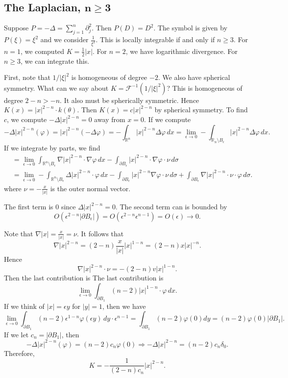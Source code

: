 \documentclass[12pt]{scrartcl}
\newcommand{\R}{\mathbb{R}}
\let \phi \varphi
\begin{document}
\subsection{The Laplacian, $ \mathbf{n \ge 3}$}
Suppose $P = -\Delta = \sum_{j=1}^n \partial_j^2$.  Then $P(D) = D^2$.  The symbol is given by $P(\xi) = \xi^2$ and we consider $\frac{1}{\xi^2}$.  This is locally integrable if and only if $n \ge 3$.  For $n = 1$, we computed $K = \frac{1}{2}|x|$.  For $n = 2$, we have logarithmic divergence.  For $n \ge 3$, we can integrate this.  

First, note that $1/|\xi|^2$ is homogeneous of degree $-2$.  We also have spherical symmetry.  What can we say about $K = \mathcal F^{-1}(1/|\xi|^2)$?  This is homogeneous of degree $2 - n > -n$.  It also must be spherically symmetric.  Hence $K(x) = |x|^{2-n} \cdot k(\theta)$.  Then $K(x) = c|x|^{2-n}$ by spherical symmetry.  To find $c$, we compute $-\Delta |x|^{2-n} = 0$ away from $x = 0$.  If we compute $$-\Delta |x|^{2-n}(\phi) = |x|^{2-n}(-\Delta \phi)= -\int_{\R^n} |x|^{2-n} \Delta \phi\, dx = \lim_{\epsilon \to 0} - \int_{\R_n\setminus B_\epsilon} |x|^{2-n} \Delta \phi \, dx.$$
If we integrate by parts, we find 
\begin{align*}
&= \lim_{\epsilon \to 0} \int_{\R^n \setminus B_\epsilon} \nabla |x|^{2-n} \cdot \nabla \phi\, dx - \int_{\partial B_\epsilon} |x|^{2-n} \cdot \nabla \phi \cdot \nu \, d\sigma\\
&= \lim_{\epsilon \to 0} -\int_{\R^n\setminus B_\epsilon} \Delta |x|^{2-n} \cdot\phi \, dx - \int_{\partial B_\epsilon} |x|^{2-n} \nabla \phi \cdot \nu \, d\sigma  +\int_{\partial B_\epsilon} \nabla |x|^{2-n} \cdot \nu \cdot \phi\,  d\sigma.
\end{align*}
where $\nu = -\frac{x}{|x|}$ is the outer normal vector.

The first term is $0$ since $\Delta |x|^{2-n} = 0$.  The second term can is bounded by 
$$O(\epsilon^{2-n} |\partial B_\epsilon|) = O(\epsilon^{2-n} \epsilon^{n-1}) = O(\epsilon) \to 0.$$


Note that $\nabla |x| = \frac{x}{|x|} = \nu$.  It follows that $$\nabla |x|^{2-n} = (2-n) \frac{x}{|x|} |x|^{1-n} = (2-n) x |x|^{-n}.$$
Hence $$\nabla |x|^{2-n} \cdot \nu = -(2 - n)v|x|^{1-n}.$$
Then the last contribution is 
The last contribution is 
$$\lim_{\epsilon \to 0} \int_{\partial B_1} (n-2)|x|^{1-n} \cdot \phi \,dx.$$
If we think of $|x| = \epsilon y$ for $|y| = 1$, then we have 
$$\lim_{\epsilon \to 0} \int_{\partial B_1} (n-2) \epsilon^{1-n} \phi(\epsilon y)\, dy \cdot \epsilon^{n-1}=  \int_{\partial B_1} (n-2) \phi(0) dy = (n-2) \phi(0)|\partial B_1|.$$
If we let $c_n = |\partial B_1|$, then
$$-\Delta |x|^{2-n}(\phi) = (n-2) c_n \phi(0) \Longrightarrow -\Delta |x|^{2-n} = (n-2)c_n \delta_0.$$
Therefore,
$$K = -\frac{1}{(2-n)c_n} |x|^{2-n}.$$
\end{document}
